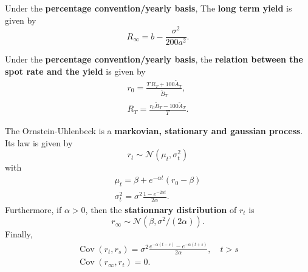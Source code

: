 \documentclass[10pt]{article}
\newcommand{\normal}{\mathscr{N}}
\DeclareMathOperator{\Cov}{Cov}
\begin{document}
\begin{outline}
  \1 Under the \textbf{percentage convention/yearly basis}, The \textbf{long term yield}
  is given by
  \begin{equation*}
    R_\infty = b - \frac{\sigma^2}{200a^2}.
  \end{equation*}

  \1 Under the \textbf{percentage convention/yearly basis}, the \textbf{relation between
    the spot rate and the yield} is given by
  \begin{gather*}
    r_0 = \frac{T\,R_T + 100 \tilde A_T}{\tilde B_T},\\
    R_T = \frac{r_0\tilde B_T - 100\tilde A_T}{T}.
  \end{gather*}
  
  \1 The Ornstein-Uhlenbeck is a \textbf{markovian, stationary and gaussian process}. Its
  law is given by
  \begin{equation*}
    r_t \sim \normal(\mu_t,\sigma^2_t)
  \end{equation*}
  with
  \begin{gather*}
    \mu_t = \beta + e^{-\alpha t}(r_0 - \beta)\\
    \sigma^2_t = \sigma^2\frac{1-e^{-2\alpha t}}{2\alpha}.
  \end{gather*}
  Furthermore, if $\alpha>0$, then the \textbf{stationnary distribution} of $r_t$ is
  \begin{equation*}
    r_\infty \sim \normal(\beta,\sigma^2/(2\alpha)).
  \end{equation*}
  Finally, 
  \begin{gather*}
    \Cov(r_t,r_s) = \sigma^2\frac{e^{-\alpha(t-s)}-e^{-\alpha(t+s)}}{2\alpha},\quad t>s\\
    \Cov(r_\infty,r_t) = 0.
  \end{gather*}
\end{outline}
\end{document}
